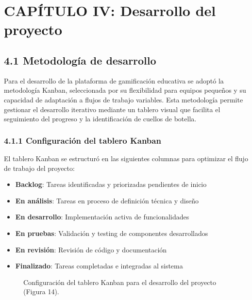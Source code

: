 \section{CAPÍTULO IV: Desarrollo del proyecto}

\subsection{4.1 Metodología de desarrollo}

Para el desarrollo de la plataforma de gamificación educativa se adoptó la metodología Kanban, seleccionada por su flexibilidad para equipos pequeños y su capacidad de adaptación a flujos de trabajo variables. Esta metodología permite gestionar el desarrollo iterativo mediante un tablero visual que facilita el seguimiento del progreso y la identificación de cuellos de botella.

\subsubsection{4.1.1 Configuración del tablero Kanban}

El tablero Kanban se estructuró en las siguientes columnas para optimizar el flujo de trabajo del proyecto:

\begin{itemize}
\item \textbf{Backlog}: Tareas identificadas y priorizadas pendientes de inicio
\item \textbf{En análisis}: Tareas en proceso de definición técnica y diseño
\item \textbf{En desarrollo}: Implementación activa de funcionalidades
\item \textbf{En pruebas}: Validación y testing de componentes desarrollados  
\item \textbf{En revisión}: Revisión de código y documentación
\item \textbf{Finalizado}: Tareas completadas e integradas al sistema
\end{itemize}

\begin{figure}[H]
	\centering
	\caption{Configuración del tablero Kanban para el desarrollo del proyecto (Figura 14).}
	\label{fig:kanban-board}
\end{figure}

